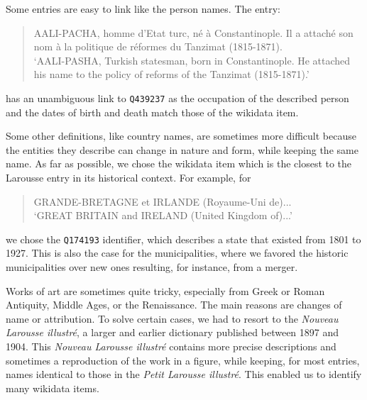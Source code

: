 \documentclass[10pt, a4paper]{article}
\begin{document}
Some entries are easy to link like the person names. The entry:
\begin{quote}
AALI-PACHA, homme d'Etat turc, né à Constantinople. Il a attaché son nom à la politique de réformes du Tanzimat (1815-1871).\\
`AALI-PASHA, Turkish statesman, born in Constantinople. He attached his name to the policy of reforms of the Tanzimat (1815-1871).'
\end{quote}
has an unambiguous link to \verb=Q439237= as the occupation of the described person and the dates of birth and death match those of the wikidata item.

Some other definitions, like country names, are sometimes more difficult because the entities they describe can change in nature and form, while keeping the same name. As far as possible, we chose the wikidata item which is the closest to the Larousse entry in its historical context. For example, for
\begin{quote}
GRANDE-BRETAGNE et IRLANDE (Royaume-Uni de)...\\
`GREAT BRITAIN and IRELAND (United Kingdom of)...'
\end{quote}
we chose the \verb=Q174193= identifier, which describes a state that existed from 1801 to 1927. This is also the case for the municipalities, where we favored the historic municipalities over new ones resulting, for instance, from a merger.

Works of art are sometimes quite tricky, especially from Greek or Roman Antiquity, Middle Ages, or the Renaissance. The main reasons are changes of name or attribution. To solve certain cases, we had to resort to the \textit{Nouveau Larousse illustré}, a larger and earlier dictionary published between 1897 and 1904. This \textit{Nouveau Larousse illustré} contains more precise descriptions and sometimes a reproduction of the work in a figure, while keeping, for most entries, names identical to those in the \textit{Petit Larousse illustré}. This enabled us to identify many wikidata items.
\end{document}
